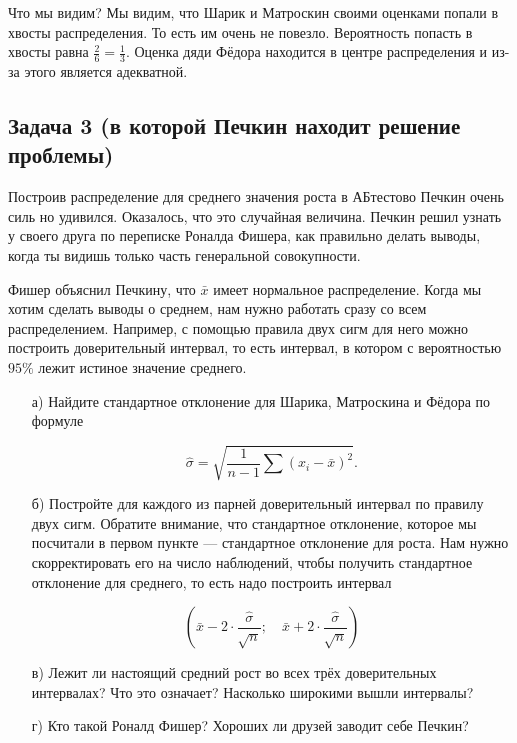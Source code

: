 \documentclass[12pt, a4paper, oneside]{article}
\begin{document}
Что мы видим? Мы видим, что Шарик и Матроскин своими оценками попали в хвосты распределения. То есть им очень не повезло.  Вероятность попасть в хвосты равна $\frac{2}{6} = \frac{1}{3}$. Оценка дяди Фёдора находится в центре распределения и из-за этого является адекватной. 



\subsection*{Задача 3 (в которой Печкин находит решение проблемы)} 

Построив распределение для среднего значения роста в АБтестово Печкин очень силь но удивился. Оказалось, что это случайная величина. Печкин решил узнать у своего друга по переписке Роналда Фишера, как правильно делать выводы, когда ты видишь только часть генеральной совокупности. 

Фишер объяснил Печкину, что $\bar x$ имеет нормальное распределение. Когда мы хотим сделать выводы о среднем, нам нужно работать сразу со всем распределением. Например, с помощью правила двух сигм для него можно построить доверительный интервал, то есть интервал, в котором с вероятностью $95\%$ лежит истиное значение среднего.  

\begin{enumerate}
	\item[а)] Найдите стандартное отклонение для Шарика, Матроскина и Фёдора по формуле 
	
	\[\hat \sigma = \sqrt{ \frac{1}{n-1}  \sum (x_i - \bar x)^2}.\]
	
	\item[б)] Постройте для каждого из парней доверительный интервал по правилу двух сигм. Обратите внимание, что стандартное отклонение, которое мы посчитали в первом пункте --- стандартное отклонение для роста. Нам нужно скорректировать его на число наблюдений, чтобы получить стандартное отклонение для среднего, то есть надо построить интервал
	
	\[ \left( \bar x - 2 \cdot \frac{\hat \sigma}{\sqrt{n}}; \quad \bar x + 2 \cdot \frac{\hat \sigma}{\sqrt{n}} \right)\] 
	
	\item[в)] Лежит ли настоящий средний рост во всех трёх доверительных интервалах? Что это означает? Насколько широкими вышли интервалы? 
		
	\item[г)] Кто такой Роналд Фишер? Хороших ли друзей заводит себе Печкин?
\end{enumerate}
\end{document}
